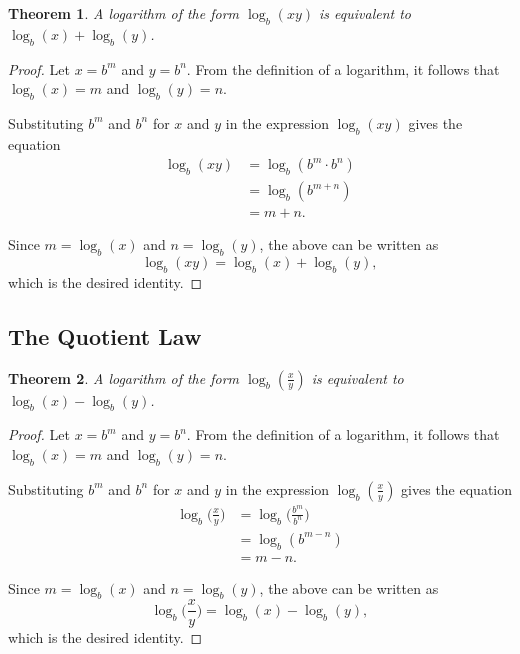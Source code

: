 \documentclass[parskip]{scrartcl}
\newtheorem*{theorem}{Theorem}
\begin{document}
\begin{theorem}
  A logarithm of the form \(\log_{b}(xy)\) is equivalent to \(\log_{b}(x) +
  \log_{b}(y)\).
\end{theorem}

\begin{proof}
  Let \(x = b^{m}\) and \(y = b^{n}\). From the definition of a logarithm, it
  follows that \(\log_{b}(x) = m\) and \(\log_{b}(y) = n\).

  Substituting \(b^{m}\) and \(b^{n}\) for \(x\) and \(y\) in the expression
  \(\log_{b}(xy)\) gives the equation
  \begin{equation*}
    \begin{split}
      \log_{b}(xy) &= \log_{b}(b^{m} · b^{n}) \\
      &= \log_{b}(b^{m + n}) \\
      &= m + n.
    \end{split}
  \end{equation*}

  Since \(m = \log_{b}(x)\) and \(n = \log_{b}(y)\), the above can be written as
  \begin{equation*}
    \log_{b}(xy) = \log_{b}(x) + \log_{b}(y),
  \end{equation*}
  which is the desired identity.
\end{proof}

\subsection{The Quotient Law}

\begin{theorem}
  A logarithm of the form \(\log_{b}(\frac{x}{y})\) is equivalent to
  \(\log_{b}(x) - \log_{b}(y)\).
\end{theorem}

\begin{proof}
  Let \(x = b^{m}\) and \(y = b^{n}\). From the definition of a logarithm, it
  follows that \(\log_{b}(x) = m\) and \(\log_{b}(y) = n\).

  Substituting \(b^{m}\) and \(b^{n}\) for \(x\) and \(y\) in the expression
  \(\log_{b}(\frac{x}{y})\) gives the equation
  \begin{equation*}
    \begin{split}
      \log_{b}\big(\frac{x}{y}\big) &= \log_{b}\big(\frac{b^{m}}{b^{n}}\big) \\
      &= \log_{b}(b^{m - n}) \\
      &= m - n.
    \end{split}
  \end{equation*}

  Since \(m = \log_{b}(x)\) and \(n = \log_{b}(y)\), the above can be written as
  \begin{equation*}
    \log_{b}\big(\frac{x}{y}\big) = \log_{b}(x) - \log_{b}(y),
  \end{equation*}
  which is the desired identity.
\end{proof}
\end{document}
